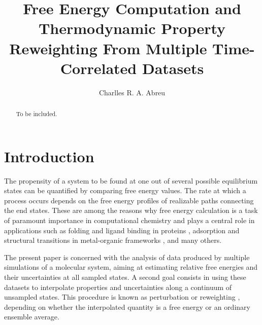 \documentclass[
    journal=jctcce,
    layout=twocolumn
]{achemso}
\author{Charlles R. A. Abreu}
\affiliation{Chemical Engineering Department, Escola de Quimica, Universidade Federal do Rio de Janeiro, Rio de Janeiro, RJ 21941-909, Brazil}
\title{Free Energy Computation and Thermodynamic Property Reweighting From Multiple Time-Correlated Datasets}
\begin{document}


\begin{abstract}
To be included.
\end{abstract}

\section{Introduction}
\label{sec:introduction}

The propensity of a system to be found at one out of several possible equilibrium states can be quantified by comparing free energy values. The rate at which a process occurs depends on the free energy profiles of realizable paths connecting the end states. These are among the reasons why free energy calculation is a task of paramount importance in computational chemistry \cite{Chipot_2007, Christ_2010, Hansen_2014} and plays a central role in applications such as folding and ligand binding in proteins \cite{Perez_2016, Chodera_2011, Abel_2017, *Abel_2017_2, Cournia_2017, Mobley_2017}, adsorption and structural transitions in metal-organic frameworks \cite{Coudert_2008, Bousquet_2012, Ghysels_2013, Demuynck_2017}, and many others.

The present paper is concerned with the analysis of data produced by multiple simulations of a molecular system, aiming at estimating relative free energies and their uncertainties at all sampled states. A second goal consists in using these datasets to interpolate properties and uncertainties along a continuum of unsampled states. This procedure is known as perturbation \cite{Zwanzig_1954} or reweighting \cite{McDonald_1967, *McDonald_1969}, depending on whether the interpolated quantity is a free energy or an ordinary ensemble average.
\end{document}
